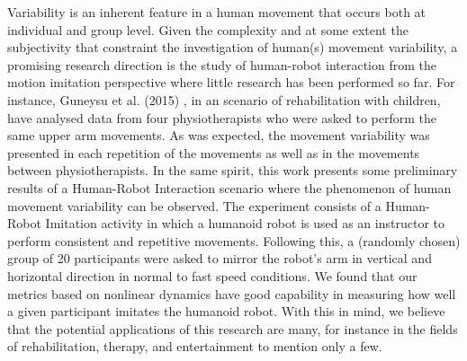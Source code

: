 \documentclass[a4paper]{article}
\begin{document}
Variability is an inherent feature in a human movement that occurs both at
individual and group level. Given the complexity and at some extent the
subjectivity that constraint the investigation of human(s) movement variability,
a promising research direction is the study of human-robot interaction from
the motion imitation perspective where little research has been performed so far.
For instance, Guneysu et al. (2015) \cite{guneysu2015children},
in an scenario of rehabilitation with children, have analysed data from
four physiotherapists who were asked to perform the same upper arm movements.
As was expected, the movement variability was presented in each repetition
of the movements as well as in the movements between physiotherapists.
In the same spirit, this work presents some preliminary results
of a Human-Robot Interaction scenario where the phenomenon
of human movement variability
can be observed.
The experiment consists of a Human-Robot Imitation activity in which a humanoid
robot is used as an instructor to perform consistent and repetitive movements.
Following this, a (randomly chosen) group of
20 participants were asked to mirror the robot's arm in vertical and horizontal
direction in normal to fast speed conditions.
We found that our metrics based on nonlinear dynamics have
good
capability in measuring how well a given participant imitates the humanoid robot.
With this in mind, we believe that the potential applications of this research
are many, for instance in the fields of rehabilitation, therapy,
and entertainment to mention only a few.




%
%
%




\end{document}
